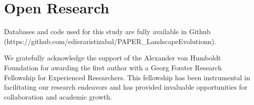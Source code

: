 \documentclass[draft]{agujournal2019}
\begin{document}
\section{Open Research}
Databases and code used for this study are fully available in Github (https://github.com/edieraristizabal/PAPER_LandscapeEvolutionn).

\acknowledgments
We gratefully acknowledge the support of the Alexander von Humboldt Foundation for awarding the first author with a Georg Forster Research Fellowship for Experienced Researchers. This fellowship has been instrumental in facilitating our research endeavors and has provided invaluable opportunities for collaboration and academic growth.


\end{document}

